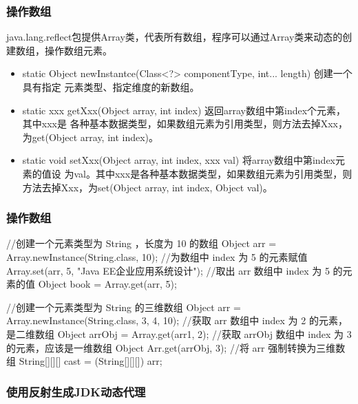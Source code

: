 \begin{frame}[fragile] %
\frametitle{操作数组}

java.lang.reflect包提供Array类，代表所有数组，程序可以通过Array类来动态的创建数组，操作数组元素。

\begin{itemize}
\item static Object newInstantce(Class<?> componentType, int... length) 创建一个具有指定
  元素类型、指定维度的新数组。
\item static xxx getXxx(Object array, int index) 返回array数组中第index个元素，其中xxx是
  各种基本数据类型，如果数组元素为引用类型，则方法去掉Xxx，为get(Object array, int
  index)。
\item static void setXxx(Object array, int index, xxx val) 将array数组中第index元素的值设
  为val。其中xxx是各种基本数据类型，如果数组元素为引用类型，则方法去掉Xxx，为set(Object
  array, int index, Object val)。
\end{itemize}
\end{frame}

\begin{frame}[fragile] %
\frametitle{操作数组}
\begin{javaCode}
//创建一个元素类型为 String ，长度为 10 的数组
Object arr = Array.newInstance(String.class, 10);
//为数组中 index 为 5 的元素赋值
Array.set(arr, 5, "Java EE企业应用系统设计");
//取出 arr 数组中 index 为 5 的元素的值
Object book = Array.get(arr, 5);

//创建一个元素类型为 String 的三维数组
Object arr = Array.newInstance(String.class, 3, 4, 10);
//获取 arr 数组中 index 为 2 的元素，是二维数组
Object arrObj = Array.get(arr1, 2);
//获取 arrObj 数组中 index 为 3 的元素，应该是一维数组
Object Arr.get(arrObj, 3);
//将 arr 强制转换为三维数组
String[][][] cast = (String[][][]) arr;
\end{javaCode}
\end{frame}

\begin{frame}[fragile] %
\frametitle{使用反射生成JDK动态代理}






\end{frame}






